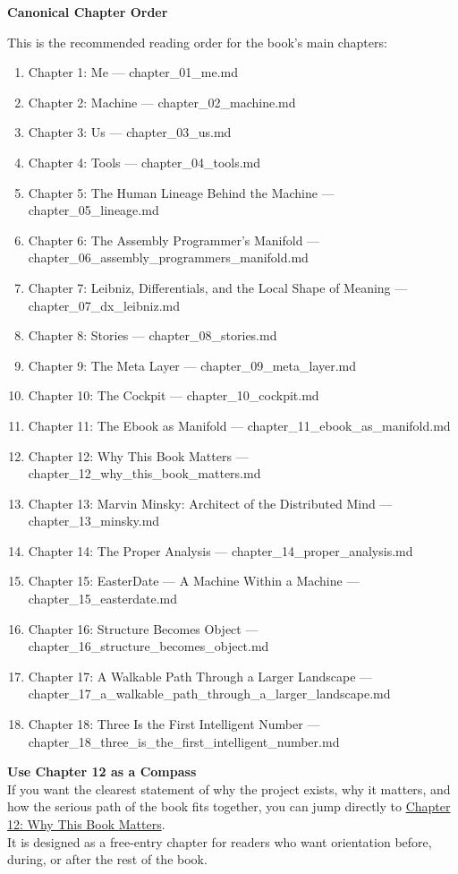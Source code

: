 \textbf{Canonical Chapter Order}

This is the recommended reading order for the book's main chapters:

\begin{enumerate}
\def\labelenumi{\arabic{enumi}.}
\tightlist
\item
  Chapter 1: Me --- chapter\_01\_me.md
\item
  Chapter 2: Machine --- chapter\_02\_machine.md
\item
  Chapter 3: Us --- chapter\_03\_us.md
\item
  Chapter 4: Tools --- chapter\_04\_tools.md
\item
  Chapter 5: The Human Lineage Behind the Machine ---
  chapter\_05\_lineage.md
\item
  Chapter 6: The Assembly Programmer's Manifold ---
  chapter\_06\_assembly\_programmers\_manifold.md
\item
  Chapter 7: Leibniz, Differentials, and the Local Shape of Meaning ---
  chapter\_07\_dx\_leibniz.md
\item
  Chapter 8: Stories --- chapter\_08\_stories.md
\item
  Chapter 9: The Meta Layer --- chapter\_09\_meta\_layer.md
\item
  Chapter 10: The Cockpit --- chapter\_10\_cockpit.md
\item
  Chapter 11: The Ebook as Manifold ---
  chapter\_11\_ebook\_as\_manifold.md
\item
  Chapter 12: Why This Book Matters ---
  chapter\_12\_why\_this\_book\_matters.md
\item
  Chapter 13: Marvin Minsky: Architect of the Distributed Mind ---
  chapter\_13\_minsky.md
\item
  Chapter 14: The Proper Analysis --- chapter\_14\_proper\_analysis.md
\item
  Chapter 15: EasterDate --- A Machine Within a Machine ---
  chapter\_15\_easterdate.md
\item
  Chapter 16: Structure Becomes Object ---
  chapter\_16\_structure\_becomes\_object.md
\item
  Chapter 17: A Walkable Path Through a Larger Landscape ---
  chapter\_17\_a\_walkable\_path\_through\_a\_larger\_landscape.md
\item
  Chapter 18: Three Is the First Intelligent Number ---
  chapter\_18\_three\_is\_the\_first\_intelligent\_number.md
\end{enumerate}

\textbf{Use Chapter 12 as a Compass}\\
If you want the clearest statement of why the project exists, why it
matters, and how the serious path of the book fits together, you can
jump directly to \href{chapter_12_why_this_book_matters.md}{Chapter 12:
Why This Book Matters}.\\
It is designed as a free-entry chapter for readers who want orientation
before, during, or after the rest of the book.


